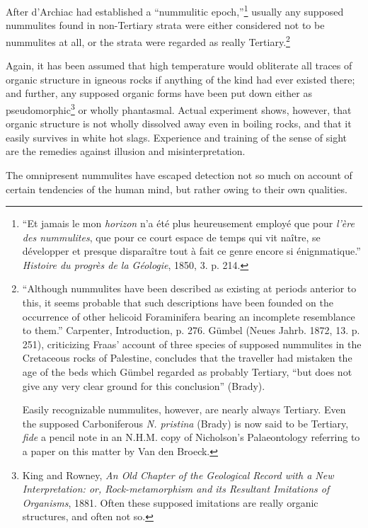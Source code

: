 \documentclass[a4paper, 12pt, oneside]{article}
\begin{document}
After d'Archiac had established a ``nummulitic epoch,''\footnote{``Et jamais le mon \emph{horizon} n'a été plus heureusement employé que pour \emph{l'ère des nummulites}, que pour ce court espace de temps qui vit naître, se développer et presque disparaître tout à fait ce genre encore si énignmatique.'' \emph{Histoire du progrès de la Géologie}, 1850, 3. p. 214.} usually any supposed nummulites found in non-Tertiary strata were either considered not to be nummulites at all, or the strata were regarded as really Tertiary.\footnote{``Although nummulites have been described as existing at periods anterior to this, it seems probable that such descriptions have been founded on the occurrence of other helicoid Foraminifera bearing an incomplete resemblance to them.'' Carpenter, Introduction, p. 276. Gümbel (Neues Jahrb. 1872, 13. p. 251), criticizing Fraas' account of three species of supposed nummulites in the Cretaceous rocks of Palestine, concludes that the traveller had mistaken the age of the beds which Gümbel regarded as probably Tertiary, ``but does not give any very clear ground for this conclusion'' (Brady).

Easily recognizable nummulites, however, are nearly always Tertiary. Even the supposed Carboniferous \emph{N. pristina} (Brady) is now said to be Tertiary, \emph{fide} a pencil note in an N.H.M. copy of Nicholson's Palaeontology referring to a paper on this matter by Van den Broeck.}

Again, it has been assumed that high temperature would obliterate all traces of organic structure in igneous rocks if anything of the kind had ever existed there; and further, any supposed organic forms have been put down either as pseudomorphic\footnote{King and Rowney, \emph{An Old Chapter of the Geological Record with a New Interpretation: or, Rock-metamorphism and its Resultant Imitations of Organisms}, 1881. Often these supposed imitations are really organic structures, and often not so.} or wholly phantasmal. Actual experiment shows, however, that organic structure is not wholly dissolved away even in boiling rocks, and that it easily survives in white hot slags. Experience and training of the sense of sight are the remedies against illusion and misinterpretation.

The omnipresent nummulites have escaped detection not so much on account of certain tendencies of the human mind, but rather owing to their own qualities.
\end{document}
